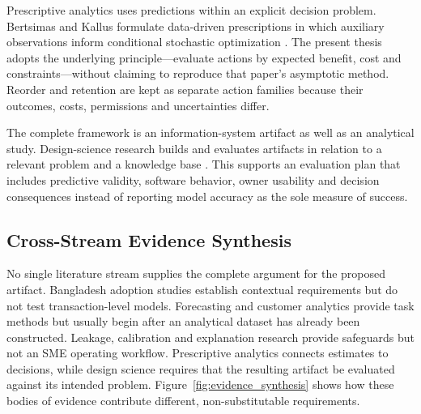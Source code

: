Prescriptive analytics uses predictions within an explicit decision problem.
Bertsimas and Kallus formulate data-driven prescriptions in which auxiliary
observations inform conditional stochastic optimization
\cite{bertsimas2020prescriptive}. The present thesis adopts the underlying
principle---evaluate actions by expected benefit, cost and constraints---without
claiming to reproduce that paper's asymptotic method. Reorder and retention are
kept as separate action families because their outcomes, costs, permissions and
uncertainties differ.

The complete framework is an information-system artifact as well as an
analytical study. Design-science research builds and evaluates artifacts in
relation to a relevant problem and a knowledge base \cite{hevner2004design}.
This supports an evaluation plan that includes predictive validity, software
behavior, owner usability and decision consequences instead of reporting model
accuracy as the sole measure of success.

\subsection{Cross-Stream Evidence Synthesis}

No single literature stream supplies the complete argument for the proposed
artifact. Bangladesh adoption studies establish contextual requirements but do
not test transaction-level models. Forecasting and customer analytics provide
task methods but usually begin after an analytical dataset has already been
constructed. Leakage, calibration and explanation research provide safeguards
but not an SME operating workflow. Prescriptive analytics connects estimates
to decisions, while design science requires that the resulting artifact be
evaluated against its intended problem. Figure~\ref{fig:evidence_synthesis}
shows how these bodies of evidence contribute different, non-substitutable
requirements.

